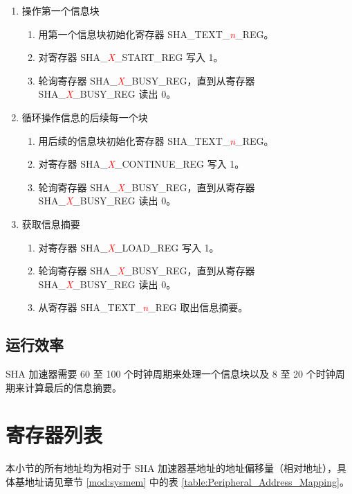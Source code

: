 \documentclass[main\_\_CN.tex]{subfiles}
\begin{document}
\begin{enumerate}
    \item 操作第一个信息块
    \begin{enumerate}
        \item 用第一个信息块初始化寄存器 SHA\_TEXT\_\textcolor{red}{\it{n}}\_REG。
		\item 对寄存器 SHA\_\textcolor{red}{\it{X}}\_START\_REG 写入 1。
		\item 轮询寄存器 SHA\_\textcolor{red}{\it{X}}\_BUSY\_REG，直到从寄存器 SHA\_\textcolor{red}{\it{X}}\_BUSY\_REG 读出 0。
    \end{enumerate}

    \item 循环操作信息的后续每一个块
    \begin{enumerate}
        \item 用后续的信息块初始化寄存器 SHA\_TEXT\_\textcolor{red}{\it{n}}\_REG。
		\item 对寄存器 SHA\_\textcolor{red}{\it{X}}\_CONTINUE\_REG 写入 1。
		\item 轮询寄存器 SHA\_\textcolor{red}{\it{X}}\_BUSY\_REG，直到从寄存器 SHA\_\textcolor{red}{\it{X}}\_BUSY\_REG 读出 0。
    \end{enumerate}

    \item 获取信息摘要
    \begin{enumerate}
        \item 对寄存器 SHA\_\textcolor{red}{\it{X}}\_LOAD\_REG 写入 1。
		\item 轮询寄存器 SHA\_\textcolor{red}{\it{X}}\_BUSY\_REG，直到从寄存器 SHA\_\textcolor{red}{\it{X}}\_BUSY\_REG 读出 0。
		\item 从寄存器 SHA\_TEXT\_\textcolor{red}{\it{n}}\_REG 取出信息摘要。
	\end{enumerate}
\end{enumerate}

\subsection{运行效率}

SHA 加速器需要 60 至 100 个时钟周期来处理一个信息块以及 8 至 20 个时钟周期来计算最后的信息摘要。

\hypertarget{sha-reg-summ}{}
\section{寄存器列表}

本小节的所有地址均为相对于 SHA 加速器基地址的地址偏移量（相对地址），具体基地址请见章节 \ref{mod:sysmem} \textit{} 中的表 \ref{table:Peripheral_Address_Mapping}。
\end{document}
